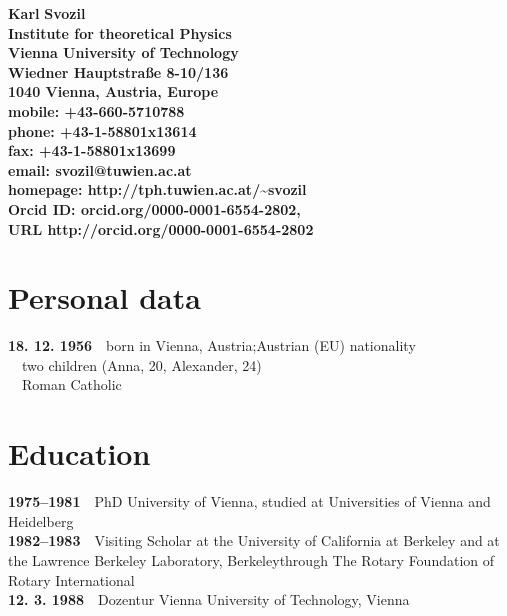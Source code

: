 \newcommand{\firstname}[1]{\textbf{#1}}
\newcommand{\familyname}[1]{\textbf{#1}}
\newcommand{\address}[1]{\textbf{#1}}
\newcommand{\titlecv}[1]{\textbf{#1}}
\newcommand{\mobile}[1]{\textbf{#1}}
\newcommand{\phone}[1]{\textbf{#1}}
\newcommand{\fax}[1]{\textbf{#1}}
\newcommand{\emailcv}[1]{\textbf{#1}}
\newcommand{\homepagecv}[1]{\textbf{#1}}
\newcommand{\cventry}[1]{\textbf{#1}$\quad$}

\firstname{Karl}
\familyname{Svozil}        \\
\address{Institute for theoretical Physics \\
Vienna University of Technology \\ Wiedner Hauptstra{\ss}e 8-10/136\\1040 Vienna, Austria, Europe}\\    %
\mobile{mobile: +43-660-5710788}              \\    %
\phone{phone: +43-1-58801x13614}             \\       %
\fax{fax: +43-1-58801x13699}               \\         %
\emailcv{email: svozil@tuwien.ac.at}         \\           %
\homepagecv{homepage: http://tph.tuwien.ac.at/{\textasciitilde}svozil}     \\           %
\homepagecv{Orcid ID: orcid.org/0000-0001-6554-2802, \\URL {http://orcid.org/0000-0001-6554-2802}}

\section{Personal data}
\cventry{18. 12. 1956}{born in Vienna, Austria;}{}{Austrian (EU) nationality}{}{}   \\
\cventry{ }{two children}{}{ (Anna, 20, Alexander, 24)}{}  {}     \\
\cventry{ }{Roman Catholic}{}{}{}  {}

\section{Education}
\cventry{1975--1981}{PhD} {University of Vienna, studied at Universities of Vienna and Heidelberg}{}{}\\ %
\cventry{1982--1983}{Visiting Scholar}{ at the University of California at Berkeley and at the Lawrence Berkeley Laboratory,}{ Berkeley}{through The Rotary Foundation of Rotary International}{}   \\
\cventry{12. 3. 1988}{Dozentur} {Vienna University of Technology,}{ Vienna}{} {}%


